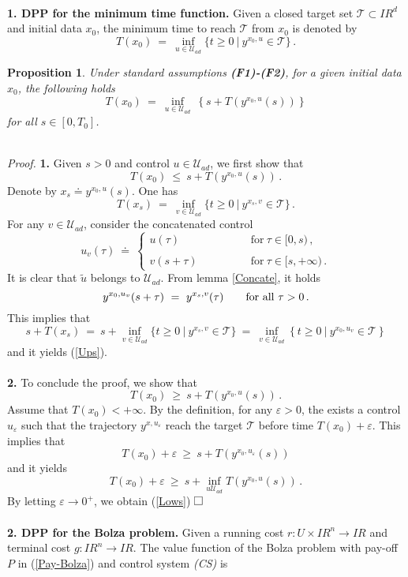 \documentclass[letterpaper,12pt]{article}
\numberwithin{equation}{section}
\newcommand{\qed}{\hfill$\square$\vspace{0.3truecm}}
\newcommand{\R}{\mathbb{R}}
\def\forall{\hbox{for all}~}
\def\ve{\varepsilon}
\def\R{I\!\!R}
\def\bel{\begin{equation}\label}
\def\eeq{\end{equation}}
\def\sqr#1#2{\vbox{\hrule height .#2pt
\hbox{\vrule width .#2pt height #1pt \kern #1pt
\vrule width .#2pt}\hrule height .#2pt }}
\def\square{\sqr74}
\newtheorem{proposition}{Proposition}[theorem]
\begin{document}
\quad\\
{\bf 1. DPP for the minimum time function.} Given a closed target set $\mathcal{T}\subset\R^d$ and initial data $x_0$, the minimum time to reach $\mathcal{T}$ from $x_0$ is denoted by 
\[
T(x_0)~=~\inf_{u\in\mathcal{U}_{ad}} \{t\geq 0~|~y^{x_0,u}\in\mathcal{T}\}\,.
\]
\begin{proposition} Under standard assumptions {\bf (F1)-(F2)}, for a given initial data $x_0$, the following holds
\bel{DDP-T}
T(x_0)~=~\inf_{u\in \mathcal{U}_{ad}}~\left\{s+ T(y^{x_0,u}(s))\right\}
\eeq
for all $s\in [0,T_0]$.
\end{proposition}
\quad\\
{\it Proof.} {\bf 1.} Given $s>0$ and control $u\in\mathcal{U}_{ad}$, we first show that 
\bel{Ups}
T(x_0)~\leq~s+T(y^{x_0,u}(s))\,.
\eeq
Denote by $x_s\doteq y^{x_0,u}(s)$. One has 
\[
T(x_s)~=~\inf_{v\in\mathcal{U}_{ad}} \{t\geq 0~|~y^{x_s,v}\in\mathcal{T}\}\,.
\]
For any $v\in\mathcal{U}_{ad}$, consider the concatenated control 
\[
u_v(\tau)~\doteq~ \left\{\begin{array}{ll}
u(\tau)\qquad&\qquad\mathrm{for}~\tau\in [0,s)\,,\\
\\
v(s+\tau)\qquad&\qquad\mathrm{for}~\tau\in [s,+\infty)\,.
\end{array}\right.
\]
It is clear that $\tilde{u}$ belongs to $\mathcal{U}_{ad}$. From lemma \ref{Concate}, it holds 
\[
y^{x_0,u_v}(s+\tau)~=~y^{x_s,v}(\tau)\qquad\forall \tau>0\,.
\]
This implies that 
\[
s+T(x_s)~=~s+\inf_{v\in\mathcal{U}_{ad}} \{t\geq 0~|~y^{x_s,v}\in\mathcal{T}\}~=~\inf_{v\in\mathcal{U}_{ad}}\left\{t\geq 0~|~y^{x_0,u_v}\in\mathcal{T}\right\}
\]
and it yields (\ref{Ups}).
\quad\\
\quad\\
{\bf 2.} To conclude the proof, we show that 
\bel{Lows}
T(x_0)~\geq~s+T(y^{x_0,u}(s))\,.
\eeq
Assume that $T(x_0)<+\infty$. By the definition, for any $\ve>0$, the exists a control $u_{\ve}$ such that the trajectory $y^{x,u_{\ve}}$ reach the target $\mathcal{T}$ before time $T(x_0)+\ve$. This implies that 
\[
T(x_0)+\ve~\geq~s+T(y^{x_0,u_{\ve}}(s))
\]
and it yields
\[
T(x_0)+\ve~\geq~s+\inf_{u\mathcal{U}_{ad}}T(y^{x_0,u}(s))\,.
\]
By letting $\ve\to 0^+$, we obtain (\ref{Lows})
\qed
\quad\\
\quad\\
{\bf 2. DPP for the Bolza problem.} Given a running cost $r:U\times\R^n\to\R$ and terminal cost $g:\R^n\to\R$. The value function of the Bolza problem with pay-off $P$ in (\ref{Pay-Bolza}) and control system {\it (CS)} is 
\end{document}
